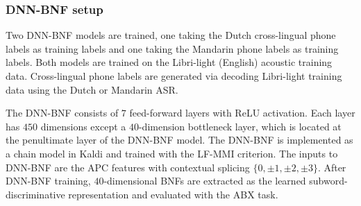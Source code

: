 \documentclass[a4paper]{article}
\begin{document}

\subsubsection{DNN-BNF setup}
Two DNN-BNF models are trained, one taking the Dutch cross-lingual phone labels as training labels and one taking the Mandarin  phone labels as training labels. Both models are trained on the Libri-light (English) acoustic training data. 
Cross-lingual phone labels are generated via decoding Libri-light training data using the Dutch or Mandarin ASR.

The DNN-BNF consists of $7$ feed-forward layers with ReLU activation. Each layer has $450$ dimensions except a $40$-dimension bottleneck layer, which is located at the penultimate layer of the DNN-BNF model. 
The DNN-BNF is implemented  as a chain model in Kaldi and trained with the   LF-MMI criterion. 
The inputs to DNN-BNF are the APC  features with contextual splicing $\{0, \pm 1, \pm 2, \pm 3\}$.
After DNN-BNF training, $40$-dimensional BNFs are extracted as the learned subword-discriminative representation and evaluated with the ABX task.
\end{document}
